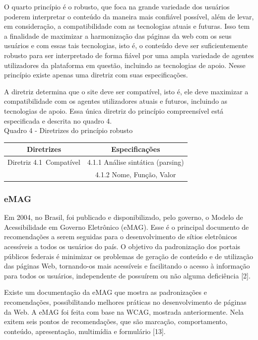 \documentclass[a4paper]{article}
\begin{document}
\begin{titlepage}
O quarto princípio é o robusto, que foca na grande variedade dos usuários poderem interpretar o conteúdo da maneira mais confiável possível, além de levar, em consideração, a compatibilidade com as tecnologias atuais e futuras. Isso tem a finalidade de maximizar a harmonização das páginas da web com os seus usuários e com essas tais tecnologias, isto é, o conteúdo deve ser suficientemente robusto para ser interpretado de forma fiável por uma ampla variedade de agentes utilizadores da plataforma em questão, incluindo as tecnologias de apoio. Nesse princípio existe apenas uma diretriz com suas especificações.

A diretriz determina que o site deve ser compatível, isto é, ele deve maximizar a compatibilidade com os agentes utilizadores atuais e futuros, incluindo as tecnologias de apoio. Essa única diretriz do princípio compreensível está especificada e descrita no quadro 4.\\

Quadro 4 - Diretrizes do princípio robusto\\[-1cm]
\begin{center}
	\fontsize{8pt}{8pt}\selectfont
	\begin{longtable}{|c|c|}
		\hline
		Diretrizes & Especificações \\
		\hline
		Diretriz 4.1 Compatível& 4.1.1 Análise sintática (parsing)\\
		& 4.1.2 Nome, Função, Valor\\
		\hline
	\end{longtable}
\end{center}

\subsubsection{eMAG}

Em 2004, no Brasil, foi publicado e disponibilizado, pelo governo, o Modelo de Acessibilidade em Governo Eletrônico (eMAG). Esse é o principal documento de recomendações a serem seguidas para o desenvolvimento de sítios eletrônicos acessíveis a todos os usuários do país. O objetivo da padronização dos portais públicos federais é minimizar os problemas de geração de conteúdo e de utilização das páginas Web, tornando-os mais acessíveis e facilitando o acesso à informação para todos os usuários, independente de possuírem ou não alguma deficiência [2].

Existe um documentação da eMAG que mostra as padronizações e recomendações, possibilitando melhores práticas no desenvolvimento de páginas da Web. A eMAG foi feita com base na WCAG, mostrada anteriormente. Nela exitem seis pontos de recomendações, que são marcação, comportamento, conteúdo, apresentação, multimídia e formulário [13].


\end{titlepage}
\end{document}
